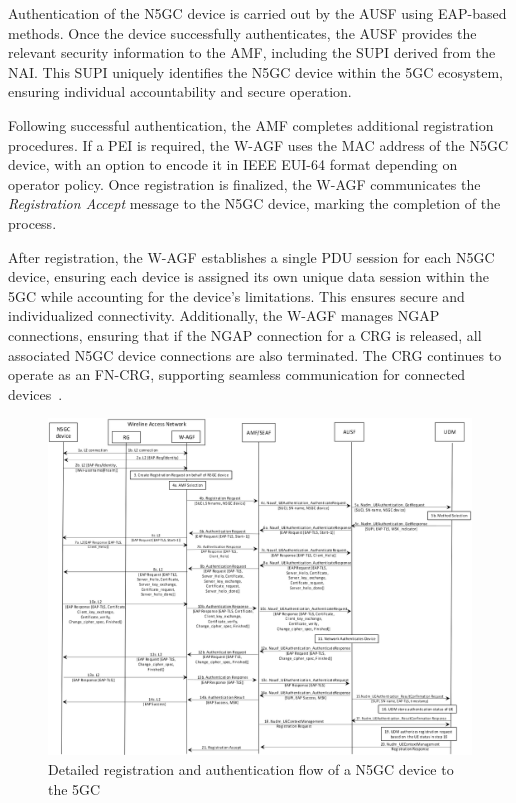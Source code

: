 Authentication of the \ac{N5GC} device is carried out by the \ac{AUSF} using \ac{EAP}-based methods. Once the device successfully authenticates, the \ac{AUSF} provides the relevant security information to the \ac{AMF}, including the \ac{SUPI} derived from the \ac{NAI}. This \ac{SUPI} uniquely identifies the \ac{N5GC} device within the \ac{5GC} ecosystem, ensuring individual accountability and secure operation.

Following successful authentication, the \ac{AMF} completes additional registration procedures. If a \ac{PEI} is required, the \ac{W-AGF} uses the \ac{MAC} address of the \ac{N5GC} device, with an option to encode it in IEEE \ac{EUI-64} format depending on operator policy. Once registration is finalized, the \ac{W-AGF} communicates the \textit{Registration Accept} message to the \ac{N5GC} device, marking the completion of the process.

After registration, the \ac{W-AGF} establishes a single \ac{PDU} session for each \ac{N5GC} device, ensuring each device is assigned its own unique data session within the \ac{5GC} while accounting for the device's limitations. This ensures secure and individualized connectivity. Additionally, the \ac{W-AGF} manages \ac{NGAP} connections, ensuring that if the \ac{NGAP} connection for a \ac{CRG} is released, all associated \ac{N5GC} device connections are also terminated. The \ac{CRG} continues to operate as an \ac{FN-CRG}, supporting seamless communication for connected devices~\cite{23.316-p25}.

\begin{figure}
    \centering
    \includegraphics[width=0.75\linewidth]{figs/Detailed registration and authentication flow of a non-5G capable device to the 5GC.png}
    \caption{Detailed registration and authentication flow of a \ac{N5GC} device to the \ac{5GC}}
    \label{fig:Detailed registration and authentication flow of a non-5G capable device to the 5GC}
\end{figure}

